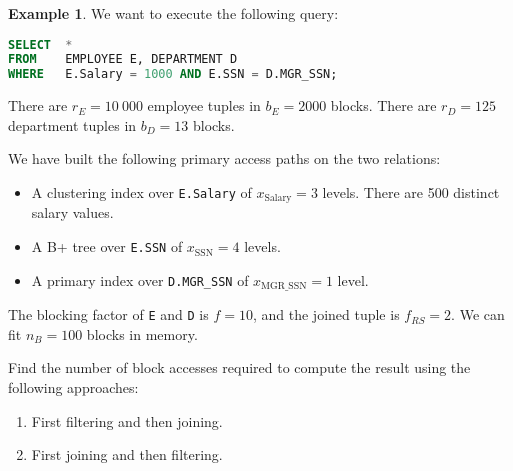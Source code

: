 \documentclass[a4paper, openany]{memoir}
\theoremstyle{definition}
\newtheorem{example}[subsection]{Example}
\begin{document}
\begin{example}
    We want to execute the following query:
\begin{lstlisting}[language=SQL]
SELECT  *
FROM    EMPLOYEE E, DEPARTMENT D
WHERE   E.Salary = 1000 AND E.SSN = D.MGR_SSN;
\end{lstlisting}
    There are $r_E = 10 \ 000$ employee tuples in $b_E = 2000$ blocks. There are $r_D = 125$ department tuples in $b_D = 13$ blocks. 

    We have built the following primary access paths on the two relations:
    \begin{itemize}
        \item A clustering index over \texttt{E.Salary} of $x_{\text{Salary}} = 3$ levels. There are 500 distinct salary values.
        \item A B+ tree over \texttt{E.SSN} of $x_{\text{SSN}} = 4$ levels.
        \item A primary index over \texttt{D.MGR\_SSN}  of $x_{\text{MGR\_SSN}} = 1$ level.
    \end{itemize}
    The blocking factor of \texttt{E} and \texttt{D} is $f = 10$, and the joined tuple is $f_{RS} = 2$. We can fit $n_B = 100$ blocks in memory. 

    Find the number of block accesses required to compute the result using the following approaches:
    \begin{enumerate}
        \item First filtering and then joining.
        \item First joining and then filtering.
    \end{enumerate}
\end{example}
\end{document}
